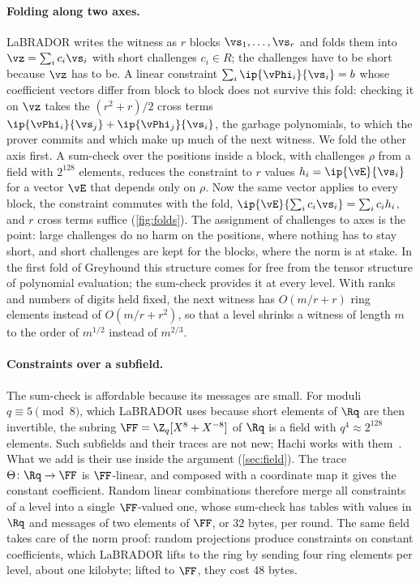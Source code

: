 \paragraph{Folding along two axes.}
LaBRADOR writes the witness as $r$ blocks $\vs_1,\dots,\vs_r$ and folds them into $\vz=\sum_ic_i\vs_i$ with short challenges $c_i\in R$; the challenges have to be short because $\vz$ has to be. A linear constraint $\sum_i\ip{\vPhi_i}{\vs_i}=b$ whose coefficient vectors differ from block to block does not survive this fold: checking it on $\vz$ takes the $(r^2+r)/2$ cross terms $\ip{\vPhi_i}{\vs_j}+\ip{\vPhi_j}{\vs_i}$, the garbage polynomials, to which the prover commits and which make up much of the next witness. We fold the other axis first. A sum-check over the positions inside a block, with challenges $\rho$ from a field with $2^{128}$ elements, reduces the constraint to $r$ values $h_i=\ip{\vE}{\vs_i}$ for a vector $\vE$ that depends only on $\rho$. Now the same vector applies to every block, the constraint commutes with the fold, $\ip{\vE}{\sum_ic_i\vs_i}=\sum_ic_ih_i$, and $r$ cross terms suffice (\cref{fig:folds}). The assignment of challenges to axes is the point: large challenges do no harm on the positions, where nothing has to stay short, and short challenges are kept for the blocks, where the norm is at stake. In the first fold of Greyhound this structure comes for free from the tensor structure of polynomial evaluation; the sum-check provides it at every level. With ranks and numbers of digits held fixed, the next witness has $O(m/r+r)$ ring elements instead of $O(m/r+r^2)$, so that a level shrinks a witness of length $m$ to the order of $m^{1/2}$ instead of $m^{2/3}$.

\paragraph{Constraints over a subfield.}
The sum-check is affordable because its messages are small. For moduli $q\equiv5\pmod8$, which LaBRADOR uses because short elements of $\Rq$ are then invertible, the subring $\FF=\Z_q[X^8+X^{-8}]$ of $\Rq$ is a field with $q^4\approx2^{128}$ elements. Such subfields and their traces are not new; Hachi works with them~\cite{NOZ26}. What we add is their use inside the argument (\cref{sec:field}). The trace $\Theta\colon\Rq\to\FF$ is $\FF$-linear, and composed with a coordinate map it gives the constant coefficient. Random linear combinations therefore merge all constraints of a level into a single $\FF$-valued one, whose sum-check has tables with values in $\Rq$ and messages of two elements of $\FF$, or $32$ bytes, per round. The same field takes care of the norm proof: random projections produce constraints on constant coefficients, which LaBRADOR lifts to the ring by sending four ring elements per level, about one kilobyte; lifted to $\FF$, they cost $48$ bytes.


